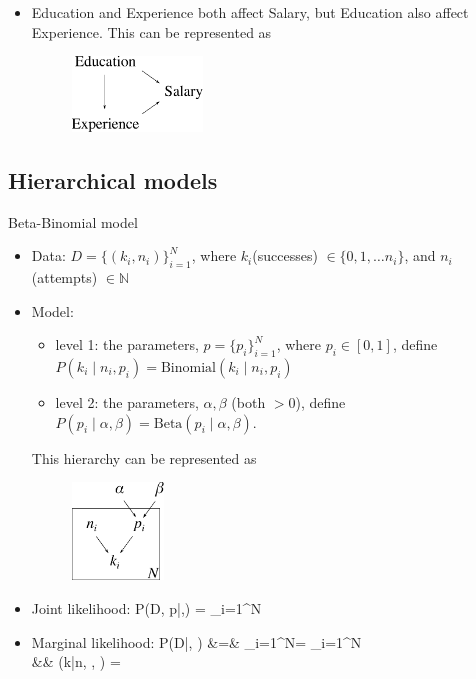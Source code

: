 \begin{itemize}
	\item Education and Experience both affect Salary, but Education also affect Experience. This can be represented as
	\begin{figure}[h!]
	\centering
		\includegraphics[height=20mm]{./figs/04-education-salary.pdf} 
	\end{figure}
\end{itemize}

\newpage
\subsection{Hierarchical models}

\no Beta-Binomial model
\begin{itemize}
	\item Data: $D = \{(k_i, n_i)\}_{i=1}^N$, where $k_i$(successes) $\in\{0, 1, \ldots n_i\}$, and $n_i$(attempts) $\in \mathds{N}$

	\item Model: 
		\begin{itemize}
			\item level 1: the parameters, $p = \{p_i\}_{i=1}^N$, where $p_i \in [0,1]$, define $P(k_i\;|\;n_i, p_i) = \text{Binomial}(k_i\;|\;n_i, p_i)$
			\item level 2: the parameters, $\alpha, \beta$ (both $>0$), define $P(p_i\;|\;\alpha, \beta) = \text{Beta}(p_i\;|\;\alpha, \beta)$.
		\end{itemize}
		This hierarchy can be represented as
		\begin{figure}[h!]
		\centering
			\includegraphics[height=26mm]{./figs/04-BetaBinomial.pdf}
		\end{figure}

	\item Joint likelihood:
	\be
		P(D, p\;|\;\alpha,\beta) = \prod_{i=1}^N
	\ee

	\item Marginal likelihood:
	\ba
		P(D\;|\;\alpha, \beta) &=& \prod_{i=1}^N = \prod_{i=1}^N
		\\
		&&
		(k\;|\;n, \alpha, \beta) =   
	\ea
\end{itemize}

